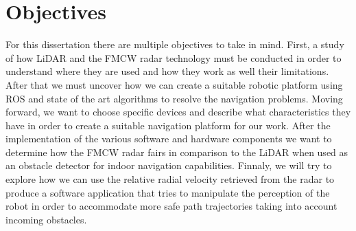 \section{Objectives}
For this dissertation there are multiple objectives to take in mind. First, a study of how \ac{LiDAR} and the \ac{FMCW} \ac{radar} technology must be conducted in order to understand where they are used and how they work as well their limitations. After that we must uncover how we can create a suitable robotic platform using \ac{ROS}  and state of the art algorithms to resolve the navigation problems. Moving forward, we want to choose  specific devices and describe what characteristics they have in order to create a suitable navigation platform for our work. After the implementation of the various software and hardware components we want to determine how the \ac{FMCW} \ac{radar} fairs in comparison to the \ac{LiDAR} when used as an obstacle detector for indoor navigation capabilities. Finnaly, we will try to explore how we can use the relative radial velocity retrieved from the \ac{radar} to produce a software application that tries to manipulate the perception of the robot in order to accommodate more safe path trajectories taking into account incoming obstacles. 












